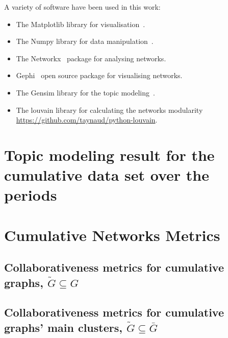 \documentclass{article}
\theoremstyle{definition}
\begin{document}
A variety of software have been used in this work:

\begin{itemize}
    \item The Matplotlib library for visualisation~\cite{hunter2007matplotlib}.
    \item The Numpy library for data manipulation~\cite{walt2011numpy}.
    \item The Networkx~\cite{networkx} package for analysing networks.
    \item Gephi~\cite{ICWSM09154} open source package for visualising networks.
    \item The Gensim library for the topic modeling~\cite{rehurek_lrec}.
    \item The louvain library for calculating the networks modularity \url{https://github.com/taynaud/python-louvain}.
\end{itemize}




\appendix

\section{Topic modeling result for the cumulative data set over the periods}\label{appendix:topics_per_year}

\begin{table}[!hbtp]
    \begin{center}
    \resizebox{\textwidth}{!}{
    }
    \end{center}
\end{table}

\section{Cumulative Networks Metrics}\label{appendix:tables}

\subsection{Collaborativeness metrics for cumulative graphs, \(\tilde{G} \subseteq G\)}
\begin{table}[!hbtp]
    \centering
    \resizebox{.8\textwidth}{!}{
    }
\end{table}

\newpage

\subsection{Collaborativeness metrics for cumulative graphs' main clusters, \(\tilde{G} \subseteq \bar{G}\)}
\begin{table}[!hbtp]
    \centering
    \resizebox{.8\textwidth}{!}{
    }
\end{table}
\end{document}
